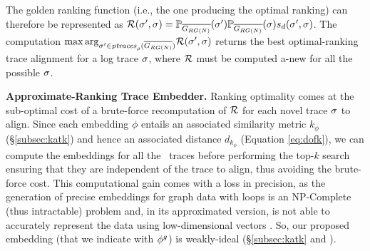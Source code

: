{The golden ranking function (i.e., the one producing the optimal ranking) can therefore be represented as $\goldenrank(\nonlogtrace,\logtrace)=\probskip{\nonlogtrace} \probskip{\logtrace} s_d(\nonlogtrace,\logtrace)$. The computation ${\max\arg}_{\nonlogtrace\in \WCal{\pmin}{n}} \goldenrank(\nonlogtrace, {\logtrace})$ returns the best optimal-ranking trace alignment for a log trace $\logtrace$, where $\goldenrank$ must be computed a-new for all the possible $\logtrace$.
	
	
\vspace{+0.2cm}	
\noindent
\textbf{Approximate-Ranking Trace Embedder.}\label{subsec:ate}
Ranking optimality comes at the sub-optimal cost of a brute-force recomputation of $\goldenrank$ for each novel trace $\logtrace$ to align.
Since each embedding $\phi$ entails an associated similarity metric $k_\phi$ (\S\ref{subsec:katk}) and hence an associated
distance $d_{k_\phi}$ (Equation \ref{eq:dofk}), we can compute the embeddings for all the \unravelled\ traces
before performing the top-$k$ search ensuring that they are independent of the trace to align, thus avoiding the brute-force cost. This computational gain comes with a loss in precision, as the generation of precise embeddings for graph data with loops is an NP-Complete (thus intractable) problem \cite{GartnerFW03} and, in its approximated version, is not able to accurately represent the data using low-dimensional vectors \cite{Seshadhri5631}. So, our proposed embedding (that we indicate with $\gorgembed$) is weakly-ideal (\S\ref{subsec:katk} and \cite{Gartner03}).

}
